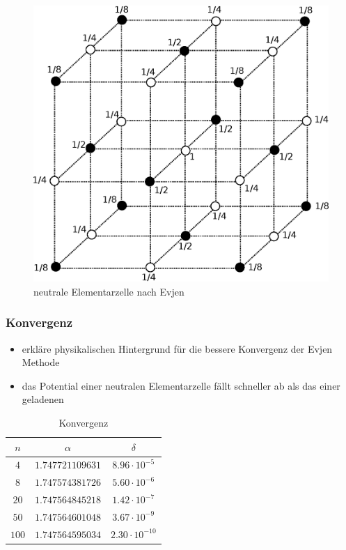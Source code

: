 \documentclass[10pt,a4paper]{article}
\begin{document}
\begin{figure}[h]
	\centering
	\includegraphics[scale = 0.35]{./figures/wuerfel.eps}
	\caption{neutrale Elementarzelle nach Evjen}
	\label{skalierungsgrafik3d}
\end{figure}

\subsubsection{Konvergenz}
\label{sssec:Konvergenz}

\begin{itemize}
\item erkläre physikalischen Hintergrund für die bessere Konvergenz der Evjen
Methode
\item das Potential einer neutralen Elementarzelle fällt schneller ab als das
einer geladenen
\end{itemize}

\begin{table}[h]
\centering
\begin{tabular}{c|c|c}
\rule[-1ex]{0pt}{2.5ex} $n$ & $\alpha$ & $\delta$ \\ 
\hline 
\rule[-1ex]{0pt}{2.5ex} $4$ & $1.747721109631$ & $8.96\cdot10^{-5}$ \\ 
\hline 
\rule[-1ex]{0pt}{2.5ex} $8$ & $1.747574381726$ & $5.60\cdot10^{-6}$ \\ 
\hline 
\rule[-1ex]{0pt}{2.5ex} $20$ & $1.747564845218$ & $1.42\cdot10^{-7}$ \\ 
\hline 
\rule[-1ex]{0pt}{2.5ex} $50$ & $1.747564601048$ & $3.67\cdot10^{-9}$ \\ 
\hline 
\rule[-1ex]{0pt}{2.5ex} $100$ & $1.747564595034$ & $2.30\cdot10^{-10}$ \\ 
\end{tabular} 
\caption{Konvergenz}
\end{table}
\end{document}
